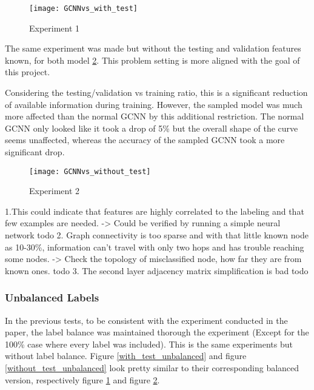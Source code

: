 \documentclass{article}
\begin{document}
\begin{figure}[h]
\centering
\texttt{[image: GCNNvs\_with\_test]}
\caption{
Experiment 1
}
\label{with_test_balanced}
\end{figure}

The same experiment %
 was made but without the testing and validation features known, for both model \ref{without_test_balanced}. %
 This problem setting is more aligned with the goal of this project.

Considering the testing/validation vs training ratio, this is a significant reduction of available information during training. However, the sampled model was much more affected than the normal GCNN by this additional restriction. The normal GCNN only %
looked like it took a drop of 5\% but the overall shape of the curve seems unaffected, whereas the accuracy of the sampled GCNN took a more significant drop.

\begin{figure}[h]
\centering
\texttt{[image: GCNNvs\_without\_test]}
\caption{
Experiment 2
}
\label{without_test_balanced}
\end{figure}


1.This could indicate that features are highly correlated to the labeling and that few examples are needed. -> Could be verified by running a simple neural network todo
2. Graph connectivity is too sparse and with that little known node as 10-30\%, information can't travel with only two hops and has trouble reaching some nodes. -> Check the topology of misclassified node, how far they are from known ones. todo
3. The second layer adjacency matrix simplification is bad todo




               
\subsubsection*{Unbalanced Labels}
In the previous tests, to be consistent with the experiment conducted in the paper, the label balance was maintained thorough the experiment (Except for the 100\% case where every label was included). This is the same experiments %
 but without %
 label balance. Figure \ref{with_test_unbalanced} and figure \ref{without_test_unbalanced} look pretty %
  similar to their corresponding balanced version, respectively figure \ref{with_test_balanced} and figure \ref{without_test_balanced}.
\end{document}
